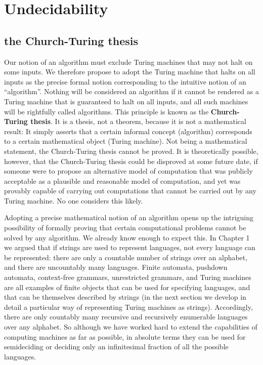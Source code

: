 \documentclass[aps,pra,onecolumn,notitlepage,superscriptaddress]{revtex4-1}
\begin{document}
    \section{Undecidability}
    \subsection{the Church-Turing thesis}
    Our notion of an algorithm must exclude Turing machines that may not halt on some inputs. We therefore propose to adopt the Turing machine that halts on all inputs as the precise formal notion corresponding to the intuitive notion of an ``algorithm''. Nothing will be considered an algorithm if it cannot be rendered as a Turing machine that is guaranteed to halt on all inputs, and all such machines will be rightfully called algorithms. This principle is known as the \textbf{Church-Turing thesis}. It is a thesis, not a theorem, because it is not a mathematical result: It simply asserts that a certain informal concept (algorithm) corresponds to a certain mathematical object (Turing machine). Not being a mathematical statement, the Church-Turing thesis cannot be proved. It is theoretically possible, however, that the Church-Turing thesis could be disproved at some future date, if someone were to propose an alternative model of computation that was publicly acceptable as a plausible and reasonable model of computation, and yet was provably capable of carrying out computations that cannot be carried out by any Turing machine. No one considers this likely. 
    
    Adopting a precise mathematical notion of an algorithm opens up the intriguing possibility of formally proving that certain computational problems cannot be solved by any algorithm. We already know enough to expect this. In Chapter 1 we argued that if strings are used to represent languages, not every language can be represented: there are only a countable number of strings over an alphabet, and there are uncountably many languages. Finite automata, pushdown automata, context-free grammars, unrestricted grammars, and Turing machines are all examples of finite objects that can be used for specifying languages, and that can be themselves described by strings (in the next section we develop in detail a particular way of representing Turing machines as strings). Accordingly, there are only countably many recursive and recursively enumerable languages over any alphabet. So although we have worked hard to extend the capabilities of computing machines as far as possible, in absolute terms they can be used for semideciding or deciding only an infinitesimal fraction of all the possible languages. 
    
\end{document}
